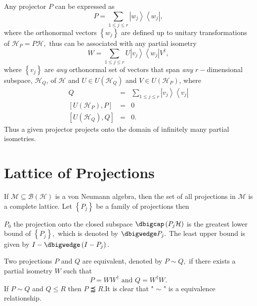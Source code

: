 \documentclass{article}
\begin{document}
Any projector $P$ can be expressed as 
\begin{equation}
P=\sum_{1\leq j\leq r}\left\vert w_{j}\right\rangle \left\langle
w_{j}\right\vert ,
\end{equation}%
where the orthonormal vectors $\left\{ w_{j}\right\} $ are defined up to
unitary transformations of $\mathcal{H}_{P}=P\mathcal{H},$ thus can be
associated with any partial isometry 
\begin{equation}
W=\sum_{1\leq j\leq r}U\left\vert v_{j}\right\rangle \left\langle
w_{j}\right\vert V^{\dagger },
\end{equation}%
where $\left\{ v_{j}\right\} $ are \emph{any} orthonormal set of vectors
that span \emph{any} $r-$dimensional subspace, $\mathcal{H}_{Q}$, of $%
\mathcal{H}$ and $U\in U\left( \mathcal{H}_{Q}\right) $ and $V\in U\left( 
\mathcal{H}_{P}\right) $, where%
\begin{eqnarray}
Q &=&\sum_{1\leq j\leq r}\left\vert v_{j}\right\rangle \left\langle
v_{j}\right\vert \\
\left[ U\left( \mathcal{H}_{P}\right) ,P\right] &=&0 \\
\left[ U\left( \mathcal{H}_{Q}\right) ,Q\right] &=&0.
\end{eqnarray}%
Thus a given projector projects onto the domain of infinitely many partial
isometries.

\section{Lattice of Projections}

If $\mathcal{M\subseteq B}\left( \mathcal{H}\right) $ is a von Neumann
algebra, then the set of all projections in $\mathcal{M}$ is a complete
lattice. Let $\left\{ P_{j}\right\} $ be a family of projections then

$P_{0}$ the projection onto the closed subspace $\dbigcap \left( P_{j}%
\mathcal{H}\right) $ is the greatest lower bound of $\left\{ P_{j}\right\} ,$
which is denoted by $\dbigwedge P_{j}.$ The least upper bound is given by $%
I-\dbigwedge \left( I-P_{j}\right) .$

Two projections $P$ and $Q$ are equivalent, denoted by $P\sim Q,$ if there
exists a partial isometry $W$ such that 
\begin{equation}
P=WW^{\dagger }\text{ and }Q=W^{\dagger }W.
\end{equation}%
If $P\sim Q$ and $Q\leq R$ then $P\precapprox R.$It is clear that " $\sim $
" is a equivalence relationship. 
\end{document}
